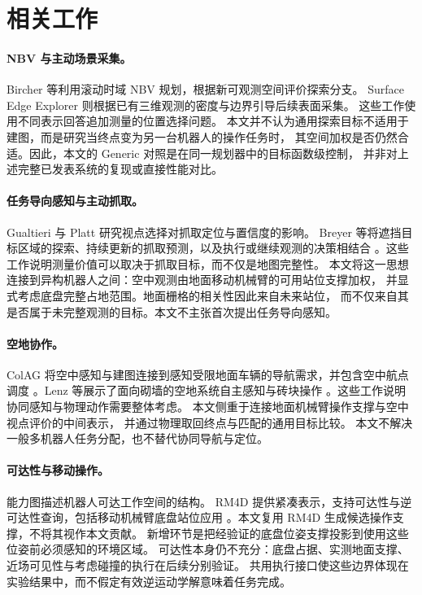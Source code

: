 \section{相关工作}
\label{sec:related}
\paragraph{NBV 与主动场景采集。}
Bircher 等利用滚动时域 NBV 规划，根据新可观测空间评价探索分支\cite{bircher2016nbv}。
Surface Edge Explorer 则根据已有三维观测的密度与边界引导后续表面采集\cite{border2018see}。
这些工作使用不同表示回答追加测量的位置选择问题。
本文并不认为通用探索目标不适用于建图，而是研究当终点变为另一台机器人的操作任务时，
其空间加权是否仍然合适。因此，本文的 Generic 对照是在同一规划器中的目标函数级控制，
并非对上述完整已发表系统的复现或直接性能对比。

\paragraph{任务导向感知与主动抓取。}
Gualtieri 与 Platt 研究视点选择对抓取定位与置信度的影响\cite{gualtieri2017viewpoint}。
Breyer 等将遮挡目标区域的探索、持续更新的抓取预测，以及执行或继续观测的决策相结合
\cite{breyer2022target}。这些工作说明测量价值可以取决于抓取目标，而不仅是地图完整性。
本文将这一思想连接到异构机器人之间：空中观测由地面移动机械臂的可用站位支撑加权，
并显式考虑底盘完整占地范围。地面栅格的相关性因此来自未来站位，
而不仅来自其是否属于未完整观测的目标。本文不主张首次提出任务导向感知。

\paragraph{空地协作。}
ColAG 将空中感知与建图连接到感知受限地面车辆的导航需求，并包含空中航点调度
\cite{li2023colag}。Lenz 等展示了面向砌墙的空地系统自主感知与砖块操作
\cite{lenz2020wall}。这些工作说明协同感知与物理动作需要整体考虑。
本文侧重于连接地面机械臂操作支撑与空中视点评价的中间表示，
并通过物理取回终点与匹配的通用目标比较。
本文不解决一般多机器人任务分配，也不替代协同导航与定位。

\paragraph{可达性与移动操作。}
能力图描述机器人可达工作空间的结构\cite{zacharias2007capability}。
RM4D 提供紧凑表示，支持可达性与逆可达性查询，包括移动机械臂底盘站位应用
\cite{rudorfer2025rm4d}。本文复用 RM4D 生成候选操作支撑，不将其视作本文贡献。
新增环节是把经验证的底盘位姿支撑投影到使用这些位姿前必须感知的环境区域。
可达性本身仍不充分：底盘占据、实测地面支撑、近场可见性与考虑碰撞的执行在后续分别验证。
共用执行接口使这些边界体现在实验结果中，而不假定有效逆运动学解意味着任务完成。
